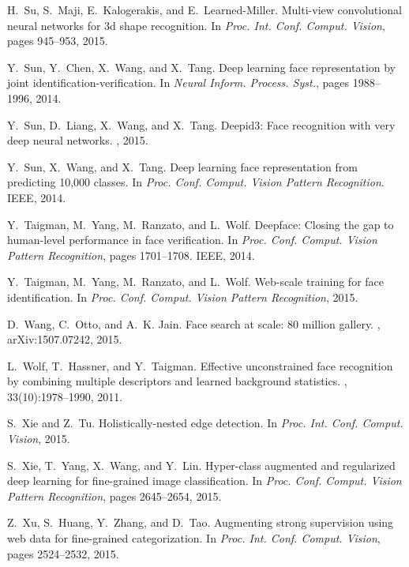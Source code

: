 \documentclass[runningheads]{llncs}
\begin{document}
\begin{thebibliography}{10}
H.~Su, S.~Maji, E.~Kalogerakis, and E.~Learned-Miller.
\newblock Multi-view convolutional neural networks for 3d shape recognition.
\newblock In {\em Proc. Int. Conf. Comput. Vision}, pages 945--953, 2015.

Y.~Sun, Y.~Chen, X.~Wang, and X.~Tang.
\newblock Deep learning face representation by joint
  identification-verification.
\newblock In {\em Neural Inform. Process. Syst.}, pages 1988--1996, 2014.

Y.~Sun, D.~Liang, X.~Wang, and X.~Tang.
\newblock Deepid3: Face recognition with very deep neural networks.
, 2015.

Y.~Sun, X.~Wang, and X.~Tang.
\newblock Deep learning face representation from predicting 10,000 classes.
\newblock In {\em Proc. Conf. Comput. Vision Pattern Recognition}. IEEE, 2014.

Y.~Taigman, M.~Yang, M.~Ranzato, and L.~Wolf.
\newblock Deepface: Closing the gap to human-level performance in face
  verification.
\newblock In {\em Proc. Conf. Comput. Vision Pattern Recognition}, pages
  1701--1708. IEEE, 2014.

Y.~Taigman, M.~Yang, M.~Ranzato, and L.~Wolf.
\newblock Web-scale training for face identification.
\newblock In {\em Proc. Conf. Comput. Vision Pattern Recognition}, 2015.

D.~Wang, C.~Otto, and A.~K. Jain.
\newblock Face search at scale: 80 million gallery.
, arXiv:1507.07242, 2015.

L.~Wolf, T.~Hassner, and Y.~Taigman.
\newblock Effective unconstrained face recognition by combining multiple
  descriptors and learned background statistics.
, 33(10):1978--1990, 2011.

S.~Xie and Z.~Tu.
\newblock Holistically-nested edge detection.
\newblock In {\em Proc. Int. Conf. Comput. Vision}, 2015.

S.~Xie, T.~Yang, X.~Wang, and Y.~Lin.
\newblock Hyper-class augmented and regularized deep learning for fine-grained
  image classification.
\newblock In {\em Proc. Conf. Comput. Vision Pattern Recognition}, pages
  2645--2654, 2015.

Z.~Xu, S.~Huang, Y.~Zhang, and D.~Tao.
\newblock Augmenting strong supervision using web data for fine-grained
  categorization.
\newblock In {\em Proc. Int. Conf. Comput. Vision}, pages 2524--2532, 2015.


\end{thebibliography}
\end{document}
